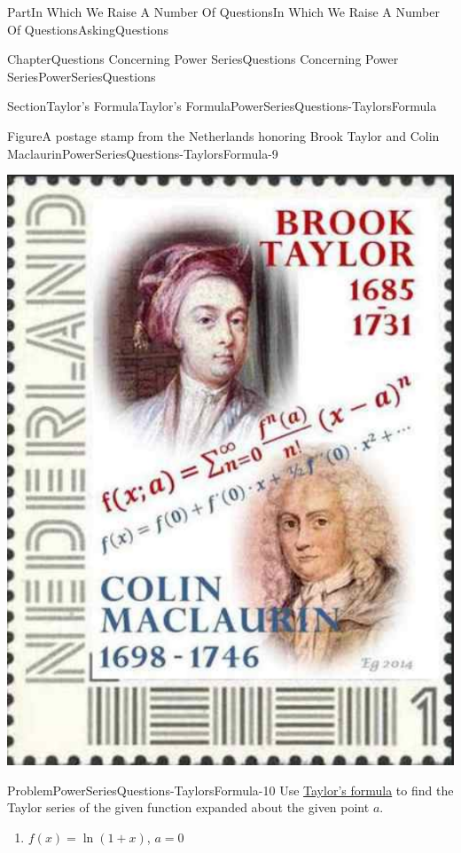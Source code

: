 \documentclass[oneside,10pt,]{book}
\numberwithin{equation}{part}
\begin{document}
\begin{partptx}{Part}{In Which We Raise A Number Of Questions}{}{In Which We Raise A Number Of Questions}{}{}{AskingQuestions}
\begin{chapterptx}{Chapter}{Questions Concerning Power Series}{}{Questions Concerning Power Series}{}{}{PowerSeriesQuestions}
\begin{sectionptx}{Section}{Taylor's Formula}{}{Taylor's Formula}{}{}{PowerSeriesQuestions-TaylorsFormula}
\begin{figureptx}{Figure}{A postage stamp from the Netherlands honoring Brook  Taylor and Colin Maclaurin}{PowerSeriesQuestions-TaylorsFormula-9}{}%
%
%
%
%
\begin{image}{0.275}{0.45}{0.275}{}%
\includegraphics[width=\linewidth]{external/images/TaylorAndMaclaurin.png}
\end{image}%
\tcblower
\end{figureptx}%
\begin{problem}{Problem}{}{PowerSeriesQuestions-TaylorsFormula-10}%
Use \hyperref[THEOREMTaylorPoly]{Taylor's formula} to find the Taylor series of the given function expanded about the given point \(a\).%
\begin{enumerate}[font=\bfseries,label=(\alph*),ref=\alph*]%
\item{}\(f(x)=\ln\left(1+x\right)\), \(a=0\)%

\end{enumerate}
\end{problem}
\end{sectionptx}
\end{chapterptx}
\end{partptx}
\end{document}
